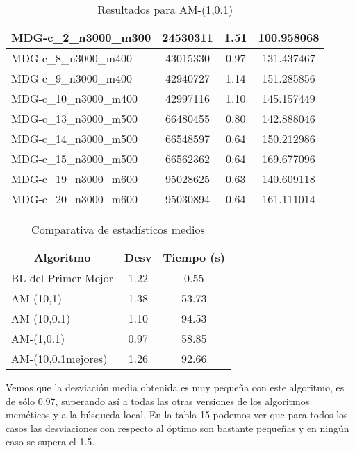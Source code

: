 \documentclass[10pt,a4paper]{article}
\begin{document}
\begin{table}[H]
\begin{center}
\begin{tabular}{|l|c|c|c|}
					MDG-c\_2\_n3000\_m300 & 24530311 & 1.51 & 100.958068 \\ \hline
					MDG-c\_8\_n3000\_m400 & 43015330 & 0.97 & 131.437467 \\ \hline
					MDG-c\_9\_n3000\_m400 & 42940727 & 1.14 & 151.285856 \\ \hline
					MDG-c\_10\_n3000\_m400 & 42997116 & 1.10 & 145.157449 \\ \hline
					MDG-c\_13\_n3000\_m500 & 66480455 & 0.80 & 142.888046 \\ \hline
					MDG-c\_14\_n3000\_m500 & 66548597 & 0.64 & 150.212986 \\ \hline
					MDG-c\_15\_n3000\_m500 & 66562362 & 0.64 & 169.677096 \\ \hline
					MDG-c\_19\_n3000\_m600 & 95028625 & 0.63 & 140.609118 \\ \hline
					MDG-c\_20\_n3000\_m600 & 95030894 & 0.64 & 161.111014 \\ \hline
				\end{tabular}
				\caption{Resultados para AM-(1,0.1) }
				\label{}
				\end{center}
			\end{table}

		\begin{table}[H]
			\begin{center}
				\begin{tabular}{|l|c|c|}
					\hline
					\multicolumn{1}{|c|}{\textbf{Algoritmo}} & \textbf{Desv} & \textbf{Tiempo (s)} \\ \hline
					BL del Primer Mejor & 1.22 & 0.55 \\ \hline
					AM-(10,1) & 1.38 & 53.73 \\ \hline
					AM-(10,0.1) & 1.10 & 94.53 \\ \hline
					AM-(1,0.1) & 0.97 & 58.85 \\ \hline
					AM-(10,0.1mejores) & 1.26 & 92.66 \\ \hline
				\end{tabular}
			\end{center}
			\caption{Comparativa de estadísticos medios}
			\label{}
		\end{table}
	
Vemos que la desviación media obtenida es muy pequeña con este algoritmo, es de sólo 0.97, superando así a todas las otras versiones de los algoritmos meméticos y a la búsqueda local. En la tabla 15 podemos ver que para todos los casos las desviaciones con respecto al óptimo son bastante pequeñas y en ningún caso se supera el 1.5. 
\end{document}
